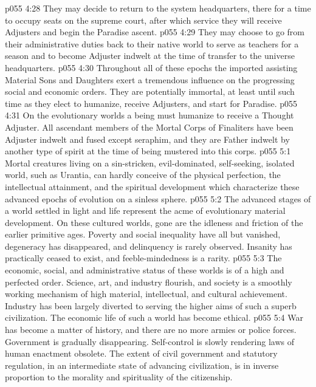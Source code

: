 \vs p055 4:28 \bibnobreakspace They may decide to return to the system headquarters, there for a time to occupy seats on the supreme court, after which service they will receive Adjusters and begin the Paradise ascent.
\vs p055 4:29 \bibnobreakspace They may choose to go from their administrative duties back to their native world to serve as teachers for a season and to become Adjuster indwelt at the time of transfer to the universe headquarters.
\vs p055 4:30 \pc Throughout all of these epochs the imported assisting Material Sons and Daughters exert a tremendous influence on the progressing social and economic orders. They are potentially immortal, at least until such time as they elect to humanize, receive Adjusters, and start for Paradise.
\vs p055 4:31 On the evolutionary worlds a being must humanize to receive a Thought Adjuster. All ascendant members of the Mortal Corps of Finaliters have been Adjuster indwelt and fused except seraphim, and they are Father indwelt by another type of spirit at the time of being mustered into this corps.
\vs p055 5:1 Mortal creatures living on a sin\hyp{}stricken, evil\hyp{}dominated, self\hyp{}seeking, isolated world, such as Urantia, can hardly conceive of the physical perfection, the intellectual attainment, and the spiritual development which characterize these advanced epochs of evolution on a sinless sphere.
\vs p055 5:2 The advanced stages of a world settled in light and life represent the acme of evolutionary material development. On these cultured worlds, gone are the idleness and friction of the earlier primitive ages. Poverty and social inequality have all but vanished, degeneracy has disappeared, and delinquency is rarely observed. Insanity has practically ceased to exist, and feeble\hyp{}mindedness is a rarity.
\vs p055 5:3 The economic, social, and administrative status of these worlds is of a high and perfected order. Science, art, and industry flourish, and society is a smoothly working mechanism of high material, intellectual, and cultural achievement. Industry has been largely diverted to serving the higher aims of such a superb civilization. The economic life of such a world has become ethical.
\vs p055 5:4 War has become a matter of history, and there are no more armies or police forces. Government is gradually disappearing. Self\hyp{}control is slowly rendering laws of human enactment obsolete. The extent of civil government and statutory regulation, in an intermediate state of advancing civilization, is in inverse proportion to the morality and spirituality of the citizenship.
